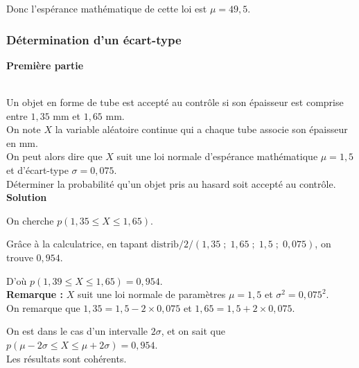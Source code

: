 \vspace*{.3cm}

Donc l'espérance mathématique de cette loi est $\mu = 49,5$. 

\newpage

\vspace*{-.5cm}

\subsubsection{Détermination d'un écart-type}

\textbf{Première partie} \\\

Un objet en forme de tube est accepté au contrôle si son épaisseur est comprise \\ entre $1,35$ mm et $1,65$ mm. \\
On note $X$ la variable aléatoire continue qui a chaque tube associe son épaisseur en mm. \\

On peut alors dire que $X$ suit une loi normale  d'espérance mathématique $\mu = 1,5$ \\ et d'écart-type $\sigma = 0,075$. \\

Déterminer la probabilité qu'un objet pris au hasard soit accepté au contrôle. \\

\textbf{Solution} 

On cherche $p\left(1,35 \leqslant X \leqslant 1,65\right)$. 

Grâce à la calculatrice, en tapant $\mathrm{distrib}/2/\left(1,35 \; ; \; 1,65 \; ; \; 1,5 \; ; \; 0,075\right)$, on trouve $0,954$. 

D'où $p\left(1,39 \leqslant X \leqslant 1,65\right) = 0,954$. \\

\textbf{Remarque :} $X$ suit une loi normale de paramètres $\mu = 1,5$ et $\sigma^2 = 0,075^2$. \\

On remarque que $1,35 = 1,5 - 2 \times 0,075$ et $1,65 = 1,5 + 2 \times 0,075$. 

On est dans le cas d'un intervalle $2\sigma$,  et on sait que $p\left(\mu - 2\sigma \leqslant X \leqslant \mu + 2\sigma\right) = 0,954$. \\

Les résultats sont cohérents. \\

